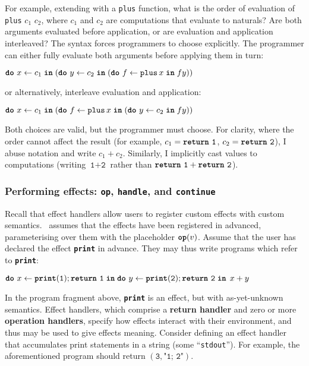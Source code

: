 For example, extending \efflang{} with a \texttt{plus} function, what is the order of evaluation of \texttt{plus} $c_1$ $c_2$, where $c_1$ and $c_2$ are computations that evaluate to naturals? Are both arguments evaluated before application, or are evaluation and application interleaved? The syntax forces programmers to choose explicitly. The programmer can either fully evaluate both arguments before applying them in turn: 
\begin{eff}
$\texttt{\textbf{do}} \,\, {x} \leftarrow {c_1} \; \textbf{\texttt{in}} \; {(\texttt{\textbf{do}} \,\, {y} \leftarrow {c_2} \; \textbf{\texttt{in}} \; {(\texttt{\textbf{do}} \,\, {f} \leftarrow {\texttt{plus} \, x} \; \textbf{\texttt{in}} \; {f y})})}$
\end{eff}
or alternatively, interleave evaluation and application:
\begin{eff}
$\texttt{\textbf{do}} \,\, {x} \leftarrow {c_1} \; \textbf{\texttt{in}} \; {(\texttt{\textbf{do}} \,\, {f} \leftarrow {\texttt{plus} \, x} \; \textbf{\texttt{in}} \; {(\texttt{\textbf{do}} \,\, {y} \leftarrow {c_2} \; \textbf{\texttt{in}} \; {f y})})}$
\end{eff}

Both choices are valid, but the programmer must choose. For clarity, where the order cannot affect the result (for example, $c_1 = \texttt{\textbf{return}} \,\, {\texttt{1}}$, $c_2 = \texttt{\textbf{return}} \,\, {\texttt{2}}$), I abuse notation and write $c_1+c_2$. Similarly, I implicitly cast values to computations (writing $\texttt{1}+\texttt{2}$ rather than $\texttt{\textbf{return}} \,\, {\texttt{1}} + \texttt{\textbf{return}} \,\, {\texttt{2}}$).

\subsubsection{Performing effects: \texttt{op}, \texttt{handle}, and \texttt{continue}}
Recall that effect handlers allow users to register custom effects with custom semantics.\ \efflang{} assumes that the effects have been registered in advanced, parameterising over them with the placeholder $\textbf{\texttt{op}}({v})$. Assume that the user has declared the effect \texttt{\textbf{print}} in advance. They may thus write programs which refer to \texttt{\textbf{print}}:
\begin{eff}
$\texttt{\textbf{do}} \,\, {x} \leftarrow {\texttt{\textbf{print}}(\texttt{1});\texttt{\textbf{return}} \,\, {\texttt{1}}} \; \textbf{\texttt{in}} \; {{\texttt{\textbf{do}} \,\, {y} \leftarrow {\texttt{\textbf{print}}(\texttt{2});\texttt{\textbf{return}} \,\, {\texttt{2}}} \; \textbf{\texttt{in}} \; {\, x + y}}}$
\end{eff}

In the program fragment above, \textbf{\texttt{print}} is an effect, but with as-yet-unknown semantics. Effect handlers, which comprise a \textbf{return handler} and zero or more \textbf{operation handlers}, specify how effects interact with their environment, and thus may be used to give effects meaning. Consider defining an effect handler that accumulates print statements in a string (some ``\texttt{stdout}'').  For example, the aforementioned program should return $(\texttt{3}, \texttt{"1; 2"})$.

